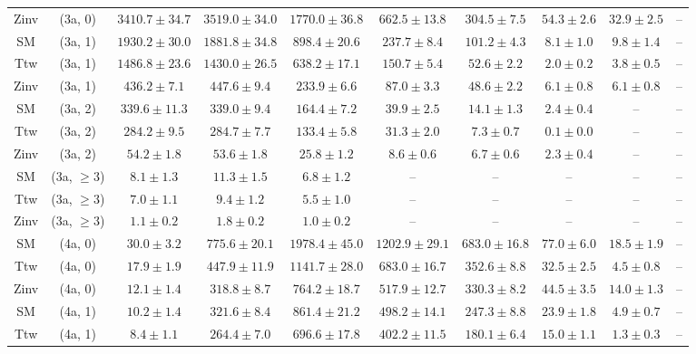 \begin{table}[h!]
{\begin{tabular}{cccccccccc}
	Zinv & (3a, 0) & $3410.7\pm 34.7$ & $3519.0\pm 34.0$ & $1770.0\pm 36.8$ & $662.5\pm 13.8$ & $304.5\pm 7.5$ & $54.3\pm 2.6$ & $32.9\pm 2.5$ & -- \\[0.5ex] 
	SM & (3a, 1) & $1930.2\pm 30.0$ & $1881.8\pm 34.8$ & $898.4\pm 20.6$ & $237.7\pm 8.4$ & $101.2\pm 4.3$ & $8.1\pm 1.0$ & $9.8\pm 1.4$ & -- \\[0.5ex] 
	Ttw & (3a, 1) & $1486.8\pm 23.6$ & $1430.0\pm 26.5$ & $638.2\pm 17.1$ & $150.7\pm 5.4$ & $52.6\pm 2.2$ & $2.0\pm 0.2$ & $3.8\pm 0.5$ & -- \\[0.5ex] 
	Zinv & (3a, 1) & $436.2\pm 7.1$ & $447.6\pm 9.4$ & $233.9\pm 6.6$ & $87.0\pm 3.3$ & $48.6\pm 2.2$ & $6.1\pm 0.8$ & $6.1\pm 0.8$ & -- \\[0.5ex] 
	SM & (3a, 2) & $339.6\pm 11.3$ & $339.0\pm 9.4$ & $164.4\pm 7.2$ & $39.9\pm 2.5$ & $14.1\pm 1.3$ & $2.4\pm 0.4$ & -- & -- \\[0.5ex] 
	Ttw & (3a, 2) & $284.2\pm 9.5$ & $284.7\pm 7.7$ & $133.4\pm 5.8$ & $31.3\pm 2.0$ & $7.3\pm 0.7$ & $0.1\pm 0.0$ & -- & -- \\[0.5ex] 
	Zinv & (3a, 2) & $54.2\pm 1.8$ & $53.6\pm 1.8$ & $25.8\pm 1.2$ & $8.6\pm 0.6$ & $6.7\pm 0.6$ & $2.3\pm 0.4$ & -- & -- \\[0.5ex] 
	SM & (3a, $\ge3$) & $8.1\pm 1.3$ & $11.3\pm 1.5$ & $6.8\pm 1.2$ & -- & -- & -- & -- & -- \\[0.5ex] 
	Ttw & (3a, $\ge3$) & $7.0\pm 1.1$ & $9.4\pm 1.2$ & $5.5\pm 1.0$ & -- & -- & -- & -- & -- \\[0.5ex] 
	Zinv & (3a, $\ge3$) & $1.1\pm 0.2$ & $1.8\pm 0.2$ & $1.0\pm 0.2$ & -- & -- & -- & -- & -- \\[0.5ex] 
	SM & (4a, 0) & $30.0\pm 3.2$ & $775.6\pm 20.1$ & $1978.4\pm 45.0$ & $1202.9\pm 29.1$ & $683.0\pm 16.8$ & $77.0\pm 6.0$ & $18.5\pm 1.9$ & -- \\[0.5ex] 
	Ttw & (4a, 0) & $17.9\pm 1.9$ & $447.9\pm 11.9$ & $1141.7\pm 28.0$ & $683.0\pm 16.7$ & $352.6\pm 8.8$ & $32.5\pm 2.5$ & $4.5\pm 0.8$ & -- \\[0.5ex] 
	Zinv & (4a, 0) & $12.1\pm 1.4$ & $318.8\pm 8.7$ & $764.2\pm 18.7$ & $517.9\pm 12.7$ & $330.3\pm 8.2$ & $44.5\pm 3.5$ & $14.0\pm 1.3$ & -- \\[0.5ex] 
	SM & (4a, 1) & $10.2\pm 1.4$ & $321.6\pm 8.4$ & $861.4\pm 21.2$ & $498.2\pm 14.1$ & $247.3\pm 8.8$ & $23.9\pm 1.8$ & $4.9\pm 0.7$ & -- \\[0.5ex] 
	Ttw & (4a, 1) & $8.4\pm 1.1$ & $264.4\pm 7.0$ & $696.6\pm 17.8$ & $402.2\pm 11.5$ & $180.1\pm 6.4$ & $15.0\pm 1.1$ & $1.3\pm 0.3$ & -- \\[0.5ex] 

\end{tabular}}
\end{table}
